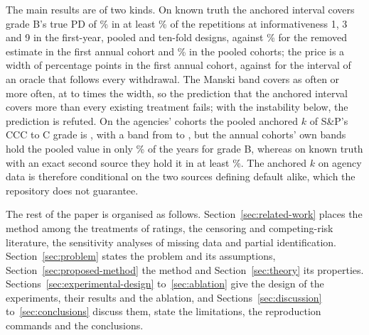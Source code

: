 The main results are of two kinds. On known truth the anchored interval covers grade B's true PD of \% in at least \% of the  repetitions at informativeness 1, 3 and 9 in the first-year, pooled and ten-fold designs, against \% for the removed estimate in the first annual cohort and \% in the pooled cohorts; the price is a width of  percentage points in the first annual cohort, against  for the interval of an oracle that follows every withdrawal. The Manski band covers as often or more often, at  to  times the width, so the prediction that the anchored interval covers more than every existing treatment fails; with the instability below, the prediction is refuted. On the agencies' cohorts the pooled anchored $k$ of S\&P's CCC to C grade is , with a band from  to , but the annual cohorts' own bands hold the pooled value in only \% of the years for grade B, whereas on known truth with an exact second source they hold it in at least \%. The anchored $k$ on agency data is therefore conditional on the two sources defining default alike, which the repository does not guarantee.

The rest of the paper is organised as follows. Section~\ref{sec:related-work} places the method among the treatments of \wdn{} ratings, the censoring and competing-risk literature, the sensitivity analyses of missing data and partial identification. Section~\ref{sec:problem} states the problem and its assumptions, Section~\ref{sec:proposed-method} the method and Section~\ref{sec:theory} its properties. Sections~\ref{sec:experimental-design} to~\ref{sec:ablation} give the design of the experiments, their results and the ablation, and Sections~\ref{sec:discussion} to~\ref{sec:conclusions} discuss them, state the limitations, the reproduction commands and the conclusions.
